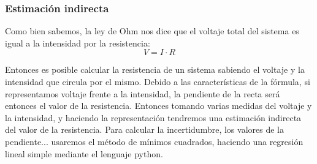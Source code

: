 \documentclass[10pt,a4paper]{article}
\begin{document}
\subsubsection{Estimación indirecta}
Como bien sabemos, la ley de Ohm nos dice que el voltaje total del sistema es igual a la intensidad por la resistencia:
\begin{equation} \label{Ley de Ohm}
V=I \cdot R
\end{equation}

Entonces es posible calcular la resistencia de un sistema sabiendo el voltaje y la intensidad que circula por el mismo. Debido a las características de la fórmula, si representamos voltaje frente a la intensidad, la pendiente de la recta será entonces el valor de la resistencia. Entonces tomando varias medidas del voltaje y la intensidad, y haciendo la representación tendremos una estimación indirecta del valor de la resistencia. Para calcular la incertidumbre, los valores de la pendiente... usaremos el método de mínimos cuadrados, haciendo una regresión lineal simple mediante el lenguaje python. \\
\end{document}
